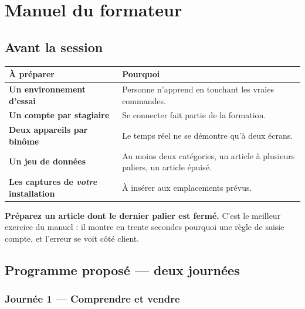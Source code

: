 \documentclass[11pt,a4paper]{report}
\begin{document}
\chapter{Manuel du formateur}
\label{ch:formateur}

\section{Avant la session}

\begin{center}
\begin{tabular}{@{}>{\bfseries}p{4.4cm} p{10.4cm}@{}}
\toprule
À préparer & Pourquoi \\
\midrule
Un environnement d'essai & Personne n'apprend en touchant les vraies commandes. \\
Un compte par stagiaire & Se connecter fait partie de la formation. \\
Deux appareils par binôme & Le temps réel ne se démontre qu'à deux écrans. \\
Un jeu de données & Au moins deux catégories, un article à plusieurs paliers,
                    un article épuisé. \\
Les captures de \emph{votre} installation & À insérer aux emplacements prévus. \\
\bottomrule
\end{tabular}
\end{center}

\begin{attention}
\textbf{Préparez un article dont le dernier palier est fermé.} C'est le meilleur
exercice du manuel : il montre en trente secondes pourquoi une règle de saisie
compte, et l'erreur se voit côté client.
\end{attention}

\section{Programme proposé — deux journées}

\subsection*{Journée 1 — Comprendre et vendre}
\end{document}
